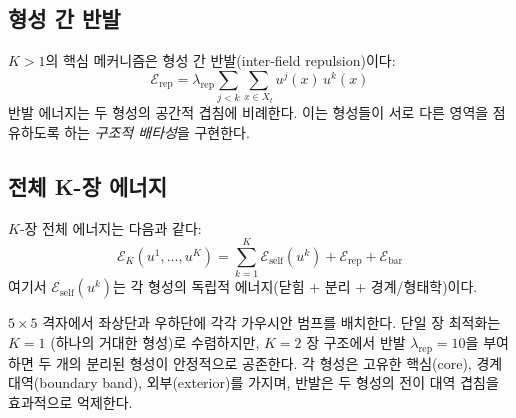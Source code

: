\subsection{형성 간 반발}

$K > 1$의 핵심 메커니즘은 형성 간 반발(inter-field repulsion)이다:
\begin{equation}
    \mathcal{E}_{\mathrm{rep}} = \lambda_{\mathrm{rep}} \sum_{j < k} \sum_{x \in X_t} u^j(x)\, u^k(x)
    \label{eq:repulsion-energy}
\end{equation}
반발 에너지는 두 형성의 공간적 겹침에 비례한다. 이는 형성들이 서로 다른 영역을 점유하도록 하는 \emph{구조적 배타성}을 구현한다.

\subsection{전체 K-장 에너지}

$K$-장 전체 에너지는 다음과 같다:
\begin{equation}
    \mathcal{E}_K(u^1, \ldots, u^K) = \sum_{k=1}^{K} \mathcal{E}_{\mathrm{self}}(u^k) + \mathcal{E}_{\mathrm{rep}} + \mathcal{E}_{\mathrm{bar}}
    \label{eq:k-field-energy}
\end{equation}
여기서 $\mathcal{E}_{\mathrm{self}}(u^k)$는 각 형성의 독립적 에너지(닫힘 + 분리 + 경계/형태학)이다.

\begin{example}[5$\times$5 격자 위의 두 범프]
\label{ex:two-bumps}
$5 \times 5$ 격자에서 좌상단과 우하단에 각각 가우시안 범프를 배치한다. 단일 장 최적화는 $K=1$ (하나의 거대한 형성)로 수렴하지만, $K=2$ 장 구조에서 반발 $\lambda_{\mathrm{rep}} = 10$을 부여하면 두 개의 분리된 형성이 안정적으로 공존한다. 각 형성은 고유한 핵심(core), 경계 대역(boundary band), 외부(exterior)를 가지며, 반발은 두 형성의 전이 대역 겹침을 효과적으로 억제한다.
\end{example}

